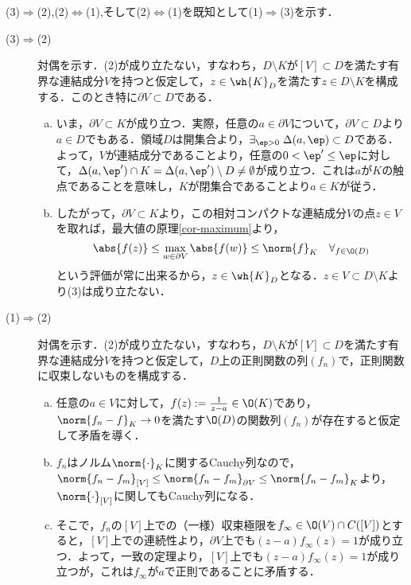 \documentclass[uplatex, dvipdfmx]{jsreport}
\begin{document}
\begin{Proof}
    (3)$\Rightarrow$(2),(2)$\Leftrightarrow$(1),そして(2)$\Leftrightarrow$(1)を既知として(1)$\Rightarrow$(3)を示す．
    \begin{description}
        \item[(3)$\Rightarrow$(2)] 
        対偶を示す．(2)が成り立たない，すなわち，$D\setminus K$が$[V]\subset D$を満たす有界な連結成分$V$を持つと仮定して，$z\in\wh{K}_D$を満たす$z\in D\setminus K$を構成する．このとき特に$\partial V\subset D$である．
        \begin{enumerate}[(a)]
            \item いま，$\partial V\subset K$が成り立つ．実際，任意の$a\in\partial V$について，$\partial V\subset D$より$a\in D$でもある．領域$D$は開集合より，$\exists_{\ep>0}\;\Delta(a,\ep)\subset D$である．よって，$V$が連結成分であることより，任意の$0<\ep'\le\ep$に対して，$\Delta(a,\ep')\cap K=\Delta(a,\ep')\setminus D\ne\emptyset$が成り立つ．これは$a$が$K$の触点であることを意味し，$K$が閉集合であることより$a\in K$が従う．
            \item したがって，$\partial V\subset K$より，この相対コンパクトな連結成分$V$の点$z\in V$を取れば，最大値の原理\ref{cor-maximum}より，
            \[\abs{f(z)}\le\max_{w\in\partial V}\abs{f(w)}\le\norm{f}_K\quad\forall_{f\in\O(D)}\]
            という評価が常に出来るから，$z\in\wh{K}_D$となる．$z\in V\subset D\setminus K$より(3)は成り立たない．
        \end{enumerate}
        \item[(1)$\Rightarrow$(2)]
        対偶を示す．(2)が成り立たない，すなわち，$D\setminus K$が$[V]\subset D$を満たす有界な連結成分$V$を持つと仮定して，$D$上の正則関数の列$(f_n)$で，正則関数に収束しないものを構成する．
        \begin{enumerate}[(a)]
            \item 任意の$a\in V$に対して，$f(z):=\frac{1}{z-a}\in\O(K)$であり，$\norm{f_n-f}_K\to0$を満たす$\O(D)$の関数列$(f_n)$が存在すると仮定して矛盾を導く．
            \item $f_n$はノルム$\norm{\cdot}_K$に関するCauchy列なので，$\norm{f_n-f_m}_{[V]}\le\norm{f_n-f_m}_{\partial V}\le\norm{f_n-f_m}_K$より，$\norm{\cdot}_{[V]}$に関してもCauchy列になる．
            \item そこで，$f_n$の$[V]$上での（一様）収束極限を$f_\infty\in\O(V)\cap C([V])$とすると，$[V]$上での連続性より，$\partial V$上でも$(z-a)f_\infty(z)=1$が成り立つ．よって，一致の定理より，$[V]$上でも$(z-a)f_\infty(z)=1$が成り立つが，これは$f_\infty$が$a$で正則であることに矛盾する．

\end{enumerate}
\end{description}
\end{Proof}
\end{document}
